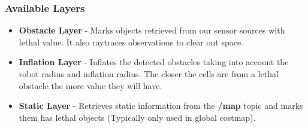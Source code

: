\subsubsection*{Available Layers}
\begin{itemize}
    \item \textbf{Obstacle Layer} - Marks objects retrieved from our sensor sources with lethal value. It also raytraces observations to clear out space.
    \item \textbf{Inflation Layer} - Inflates the detected obstacles taking into account the robot radius and inflation radius. The closer the cells are from a lethal obstacle the more value they will have.
    \item \textbf{Static Layer} - Retrieves static information from the \textbf{/map} topic and marks them has lethal objects (Typically only used in global costmap).
\end{itemize}






